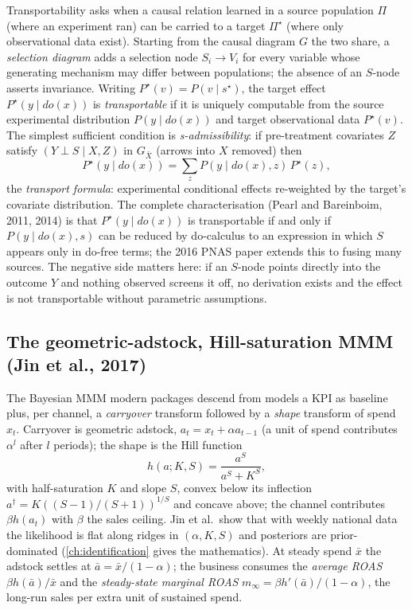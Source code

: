 Transportability asks when a causal relation learned in a source population $\Pi$ (where an experiment ran) can be carried to a target $\Pi^\star$ (where only observational data exist). Starting from the causal diagram $G$ the two share, a \emph{selection diagram} adds a selection node $S_i \to V_i$ for every variable whose generating mechanism may differ between populations; the absence of an $S$-node asserts invariance. Writing $P^\star(v) = P(v \mid s^\star)$, the target effect $P^\star(y \mid do(x))$ is \emph{transportable} if it is uniquely computable from the source experimental distribution $P(y \mid do(x))$ and target observational data $P^\star(v)$. The simplest sufficient condition is \emph{s-admissibility}: if pre-treatment covariates $Z$ satisfy $(Y \perp S \mid X, Z)$ in $G_{\bar X}$ (arrows into $X$ removed) then
\begin{equation}
P^\star(y \mid do(x)) = \sum_z P(y \mid do(x), z)\,P^\star(z),
\label{eq:transport:formula}
\end{equation}
the \emph{transport formula}: experimental conditional effects re-weighted by the target's covariate distribution. The complete characterisation (Pearl and Bareinboim, 2011, 2014) is that $P^\star(y \mid do(x))$ is transportable if and only if $P(y \mid do(x), s)$ can be reduced by do-calculus to an expression in which $S$ appears only in do-free terms; the 2016 PNAS paper extends this to fusing many sources. The negative side matters here: if an $S$-node points directly into the outcome $Y$ and nothing observed screens it off, no derivation exists and the effect is not transportable without parametric assumptions.

\subsection{The geometric-adstock, Hill-saturation MMM (Jin et al., 2017)}

The Bayesian MMM modern packages descend from models a KPI as baseline plus, per channel, a \emph{carryover} transform followed by a \emph{shape} transform of spend $x_t$. Carryover is geometric adstock, $a_t = x_t + \alpha a_{t-1}$ (a unit of spend contributes $\alpha^l$ after $l$ periods); the shape is the Hill function
\begin{equation}
h(a; K, S) = \frac{a^S}{a^S + K^S},
\label{eq:transport:hill}
\end{equation}
with half-saturation $K$ and slope $S$, convex below its inflection $a^\dagger = K((S-1)/(S+1))^{1/S}$ and concave above; the channel contributes $\beta h(a_t)$ with $\beta$ the sales ceiling. Jin et al.\ show that with weekly national data the likelihood is flat along ridges in $(\alpha, K, S)$ and posteriors are prior-dominated (\cref{ch:identification} gives the mathematics). At steady spend $\bar x$ the adstock settles at $\bar a = \bar x/(1-\alpha)$; the business consumes the \emph{average ROAS} $\beta h(\bar a)/\bar x$ and the \emph{steady-state marginal ROAS} $m_\infty = \beta h'(\bar a)/(1-\alpha)$, the long-run sales per extra unit of sustained spend.

